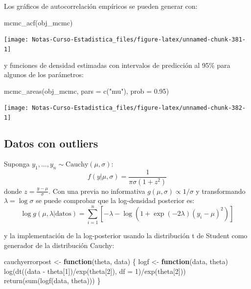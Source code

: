 \documentclass[
  12pt,
]{book}
\newenvironment{Shaded}{\begin{snugshade}}{\end{snugshade}}
\newcommand{\AttributeTok}[1]{\textcolor[rgb]{0.77,0.63,0.00}{#1}}
\newcommand{\ControlFlowTok}[1]{\textcolor[rgb]{0.13,0.29,0.53}{\textbf{#1}}}
\newcommand{\DecValTok}[1]{\textcolor[rgb]{0.00,0.00,0.81}{#1}}
\newcommand{\FloatTok}[1]{\textcolor[rgb]{0.00,0.00,0.81}{#1}}
\newcommand{\FunctionTok}[1]{\textcolor[rgb]{0.00,0.00,0.00}{#1}}
\newcommand{\NormalTok}[1]{#1}
\newcommand{\OtherTok}[1]{\textcolor[rgb]{0.56,0.35,0.01}{#1}}
\newcommand{\SpecialCharTok}[1]{\textcolor[rgb]{0.00,0.00,0.00}{#1}}
\newcommand{\StringTok}[1]{\textcolor[rgb]{0.31,0.60,0.02}{#1}}
\theoremstyle{definition}
\theoremstyle{definition}
\theoremstyle{definition}
\theoremstyle{definition}
\theoremstyle{remark}
\begin{document}
Los gráficos de autocorrelación empíricos se pueden generar con:

\begin{Shaded}
\begin{Highlighting}[]
\FunctionTok{mcmc\_acf}\NormalTok{(obj\_mcmc)}
\end{Highlighting}
\end{Shaded}

\begin{center}\texttt{[image: Notas-Curso-Estadistica\_files/figure-latex/unnamed-chunk-381-1]} \end{center}

y funciones de densidad estimadas con intervalos de predicción al 95\% para algunos de los parámetros:

\begin{Shaded}
\begin{Highlighting}[]
\FunctionTok{mcmc\_areas}\NormalTok{(obj\_mcmc, }\AttributeTok{pars =} \FunctionTok{c}\NormalTok{(}\StringTok{"mu"}\NormalTok{), }\AttributeTok{prob =} \FloatTok{0.95}\NormalTok{)}
\end{Highlighting}
\end{Shaded}

\begin{center}\texttt{[image: Notas-Curso-Estadistica\_files/figure-latex/unnamed-chunk-382-1]} \end{center}

\hypertarget{datos-con-outliers}{%
\subsection{Datos con outliers}\label{datos-con-outliers}}

Suponga \(y_1,\ldots,y_n\sim \text{Cauchy}(\mu,\sigma)\):
\[f(y|\mu,\sigma)=\frac{1}{\pi\sigma(1+z^2)}\]
donde \(z=\frac{y-\mu}{\sigma}\). Con una previa no informativa \(g(\mu,\sigma)\propto 1/\sigma\) y transformando \(\lambda = \log \sigma\) se puede comprobar que la log-densidad posterior es:
\[\log g(\mu,\lambda|\text{datos}) = \sum_{i=1}^n\left[-\lambda-\log\left(1+\exp(-2\lambda)(y_i-\mu)^2\right)\right]\]

y la implementación de la log-posterior usando la distribución t de Student como generador de la distribución Cauchy:

\begin{Shaded}
\begin{Highlighting}[]
\NormalTok{cauchyerrorpost }\OtherTok{\textless{}{-}} \ControlFlowTok{function}\NormalTok{(theta, data) \{}
\NormalTok{    logf }\OtherTok{\textless{}{-}} \ControlFlowTok{function}\NormalTok{(data, theta) }\FunctionTok{log}\NormalTok{(}\FunctionTok{dt}\NormalTok{((data }\SpecialCharTok{{-}}\NormalTok{ theta[}\DecValTok{1}\NormalTok{])}\SpecialCharTok{/}\FunctionTok{exp}\NormalTok{(theta[}\DecValTok{2}\NormalTok{]),}
        \AttributeTok{df =} \DecValTok{1}\NormalTok{)}\SpecialCharTok{/}\FunctionTok{exp}\NormalTok{(theta[}\DecValTok{2}\NormalTok{]))}
    \FunctionTok{return}\NormalTok{(}\FunctionTok{sum}\NormalTok{(}\FunctionTok{logf}\NormalTok{(data, theta)))}
\NormalTok{\}}
\end{Highlighting}
\end{Shaded}
\end{document}
